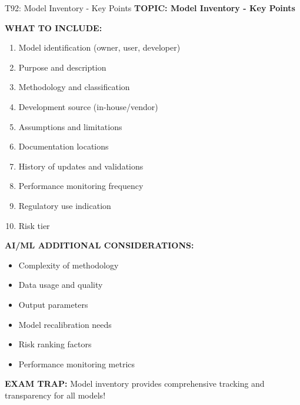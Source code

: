\documentclass[8pt]{beamer}
\begin{document}
	\begin{frame}{T92: Model Inventory - Key Points}
		\fontsize{6.5}{7.5}\selectfont
		\textbf{TOPIC: Model Inventory - Key Points}
		
		\vspace{0.1cm}
		\textbf{WHAT TO INCLUDE:}
		\begin{enumerate}
			\item Model identification (owner, user, developer)
			\item Purpose and description
			\item Methodology and classification
			\item Development source (in-house/vendor)
			\item Assumptions and limitations
			\item Documentation locations
			\item History of updates and validations
			\item Performance monitoring frequency
			\item Regulatory use indication
			\item Risk tier
		\end{enumerate}
		
		\vspace{0.1cm}
		\textbf{AI/ML ADDITIONAL CONSIDERATIONS:}
		\begin{itemize}
			\item Complexity of methodology
			\item Data usage and quality
			\item Output parameters
			\item Model recalibration needs
			\item Risk ranking factors
			\item Performance monitoring metrics
		\end{itemize}
		
		\textcolor{myred}{\textbf{EXAM TRAP:}} Model inventory provides \textcolor{myblue}{comprehensive tracking and transparency} for all models!
	\end{frame}
	
\end{document}
